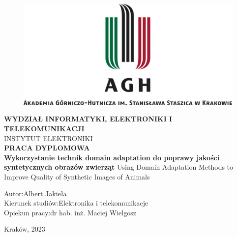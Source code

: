\begin{titlepage}
            
    \begin{center}
            \vspace{24.5pt}
            
            \begin{figure}[h!]
                \center
                \includegraphics[width=14cm]{src/title_page/loga/agh_logo.png}
            \end{figure}
            
            \vspace{13.5pt}
            \textbf{WYDZIAŁ INFORMATYKI, ELEKTRONIKI I TELEKOMUNIKACJI}\\
            \small{INSTYTUT ELEKTRONIKI}\\
            \vspace{54pt}
            \LARGE{\textbf{PRACA DYPLOMOWA}}\\
            \vspace{13.5pt}
            \large{\textbf{Wykorzystanie technik domain adaptation do poprawy jakości syntetycznych obrazów zwierząt}}
            \linebreak
            Using Domain Adaptation Methods to Improve Quality of Synthetic Images of Animals 
            \vspace{5cm}
            
        \begin{flushleft}
            Autor:\hspace{3.4cm}Albert Jakieła\\
            Kierunek studiów:\hspace{1cm}Elektronika i telekomunikacje\\
            Opiekun pracy:\hspace{1.6cm}dr hab. inż. Maciej Wielgosz\\
        \end{flushleft}
        
        \vspace{0.5cm}
        Kraków, 2023
        
    \end{center}

\end{titlepage}
